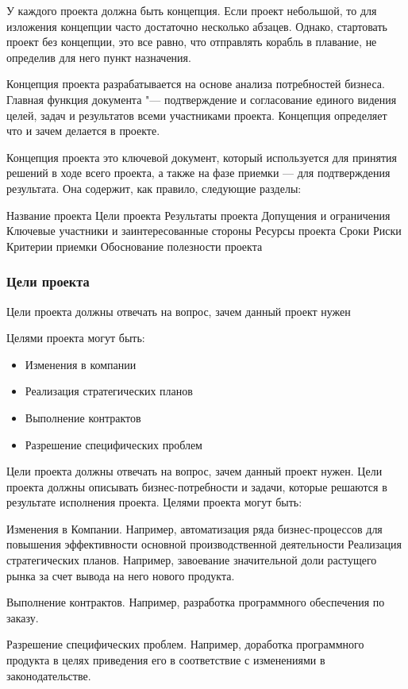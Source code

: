 \documentclass{../industrial-development}
\begin{document}
У каждого проекта должна быть концепция. Если проект небольшой, то для изложения концепции часто достаточно несколько абзацев. Однако, стартовать проект без концепции, это все равно, что отправлять корабль в плавание, не определив для него пункт назначения.

Концепция проекта разрабатывается на основе анализа потребностей бизнеса. Главная функция документа "--- подтверждение и согласование единого видения целей, задач и результатов всеми участниками проекта. Концепция определяет что и зачем делается в проекте.

Концепция проекта это ключевой документ, который используется для принятия решений в ходе всего проекта, а также на фазе приемки — для подтверждения результата. Она содержит, как правило, следующие разделы:

Название проекта
Цели проекта
Результаты проекта
Допущения и ограничения
Ключевые участники и заинтересованные стороны
Ресурсы проекта
Сроки
Риски
Критерии приемки
Обоснование полезности проекта

    \begin{frame} \frametitle{Цели проекта}
    Цели проекта должны отвечать на вопрос, зачем данный проект нужен
    
	Целями проекта могут быть:
	\begin{itemize}
		\item Изменения в компании
		\item Реализация стратегических планов
		\item Выполнение контрактов
		\item Разрешение специфических проблем
	\end{itemize}
    \end{frame}
    \lecturenotes

Цели проекта должны отвечать на вопрос, зачем данный проект нужен. Цели проекта должны описывать бизнес-потребности и задачи, которые решаются в результате исполнения проекта. Целями проекта могут быть:

Изменения в Компании. Например, автоматизация ряда бизнес-процессов для повышения эффективности основной производственной деятельности
Реализация стратегических планов. Например, завоевание значительной доли растущего рынка за счет вывода на него нового продукта.

Выполнение контрактов. Например, разработка программного обеспечения по заказу.

Разрешение специфических проблем. Например, доработка программного продукта в целях приведения его в соответствие с изменениями в законодательстве.
\end{document}
